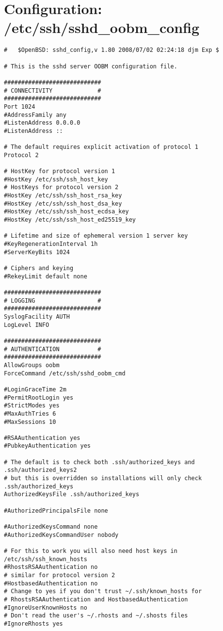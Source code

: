 \section{Configuration: /etc/ssh/sshd\_oobm\_config}
\label{section:appendix-ssh-sshdoobmconfig}
\begin{verbatim}
#	$OpenBSD: sshd_config,v 1.80 2008/07/02 02:24:18 djm Exp $

# This is the sshd server OOBM configuration file.

############################
# CONNECTIVITY             #
############################
Port 1024
#AddressFamily any
#ListenAddress 0.0.0.0
#ListenAddress ::

# The default requires explicit activation of protocol 1
Protocol 2

# HostKey for protocol version 1
#HostKey /etc/ssh/ssh_host_key
# HostKeys for protocol version 2
#HostKey /etc/ssh/ssh_host_rsa_key
#HostKey /etc/ssh/ssh_host_dsa_key
#HostKey /etc/ssh/ssh_host_ecdsa_key
#HostKey /etc/ssh/ssh_host_ed25519_key

# Lifetime and size of ephemeral version 1 server key
#KeyRegenerationInterval 1h
#ServerKeyBits 1024

# Ciphers and keying
#RekeyLimit default none

############################
# LOGGING                  #
############################
SyslogFacility AUTH
LogLevel INFO

############################
# AUTHENTICATION           #
############################
AllowGroups oobm
ForceCommand /etc/ssh/sshd_oobm_cmd

#LoginGraceTime 2m
#PermitRootLogin yes
#StrictModes yes
#MaxAuthTries 6
#MaxSessions 10

#RSAAuthentication yes
#PubkeyAuthentication yes

# The default is to check both .ssh/authorized_keys and .ssh/authorized_keys2
# but this is overridden so installations will only check .ssh/authorized_keys
AuthorizedKeysFile .ssh/authorized_keys

#AuthorizedPrincipalsFile none

#AuthorizedKeysCommand none
#AuthorizedKeysCommandUser nobody

# For this to work you will also need host keys in /etc/ssh/ssh_known_hosts
#RhostsRSAAuthentication no
# similar for protocol version 2
#HostbasedAuthentication no
# Change to yes if you don't trust ~/.ssh/known_hosts for
# RhostsRSAAuthentication and HostbasedAuthentication
#IgnoreUserKnownHosts no
# Don't read the user's ~/.rhosts and ~/.shosts files
#IgnoreRhosts yes


\end{verbatim}
